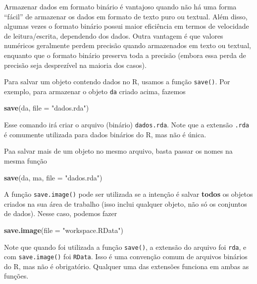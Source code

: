 \documentclass[10pt,a4paper]{book}
\newenvironment{Shaded}{\begin{snugshade}}{\end{snugshade}}
\newcommand{\KeywordTok}[1]{\textcolor[rgb]{0.13,0.29,0.53}{\textbf{#1}}}
\newcommand{\DataTypeTok}[1]{\textcolor[rgb]{0.13,0.29,0.53}{#1}}
\newcommand{\StringTok}[1]{\textcolor[rgb]{0.31,0.60,0.02}{#1}}
\newcommand{\NormalTok}[1]{#1}
\begin{document}
Armazenar dados em formato binário é vantajoso quando não há uma forma
``fácil'' de armazenar os dados em formato de texto puro ou textual.
Além disso, algumas vezes o formato binário possui maior eficiência em
termos de velocidade de leitura/escrita, dependendo dos dados. Outra
vantagem é que valores numéricos geralmente perdem precisão quando
armazenados em texto ou textual, enquanto que o formato binário preserva
toda a precisão (embora essa perda de precisão seja desprezível na
maioria dos casos).

Para salvar um objeto contendo dados no R, usamos a função
\texttt{save()}. Por exemplo, para armazenar o objeto \texttt{da} criado
acima, fazemos

\begin{Shaded}
\begin{Highlighting}[]
\KeywordTok{save}\NormalTok{(da, }\DataTypeTok{file =} \StringTok{"dados.rda"}\NormalTok{)}
\end{Highlighting}
\end{Shaded}

Esse comando irá criar o arquivo (binário) \texttt{dados.rda}. Note que
a extensão \texttt{.rda} é comumente utilizada para dados binários do R,
mas não é única.

Paa salvar mais de um objeto no mesmo arquivo, basta passar os nomes na
mesma função

\begin{Shaded}
\begin{Highlighting}[]
\KeywordTok{save}\NormalTok{(da, ma, }\DataTypeTok{file =} \StringTok{"dados.rda"}\NormalTok{)}
\end{Highlighting}
\end{Shaded}

A função \texttt{save.image()} pode ser utilizada se a intenção é salvar
\textbf{todos} os objetos criados na sua área de trabalho (isso inclui
qualquer objeto, não só os conjuntos de dados). Nesse caso, podemos
fazer

\begin{Shaded}
\begin{Highlighting}[]
\KeywordTok{save.image}\NormalTok{(}\DataTypeTok{file =} \StringTok{"workspace.RData"}\NormalTok{)}
\end{Highlighting}
\end{Shaded}

Note que quando foi utilizada a função \texttt{save()}, a extensão do
arquivo foi \texttt{rda}, e com \texttt{save.image()} foi
\texttt{RData}. Isso é uma convenção comum de arquivos binários do R,
mas não é obrigatório. Qualquer uma das extensões funciona em ambas as
funções.
\end{document}
